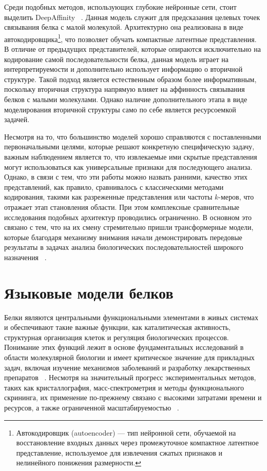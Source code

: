 \documentclass[specification,annotation,times]{itmo-student-thesis}
\begin{document}
Среди подобных методов, использующих глубокие нейронные сети, стоит выделить DeepAffinity ~\cite{karimi2019deepaffinity}. Данная модель служит для предсказания целевых точек связывания белка с малой молекулой. Архитектурно она реализована в виде автокодировщика\footnote{Автокодировщик (autoencoder) --- тип нейронной сети, обучаемой на восстановление входных данных через промежуточное компактное латентное представление, используемое для извлечения сжатых признаков и нелинейного понижения размерности.}, что позволяет обучать компактные латентные представления. В отличие от предыдущих представителей, которые опираются исключительно на кодирование самой последовательности белка, данная модель играет на интерпретируемости и дополнительно использует информацию о вторичной структуре. Такой подход является естественным образом более информативным, поскольку вторичная структура напрямую влияет на аффинность связывания белков с малыми молекулами. Однако наличие дополнительного этапа в виде моделирования вторичной структуры само по себе является ресурсоемкой задачей.

Несмотря на то, что большинство моделей хорошо справляются с поставленными первоначальными целями, которые решают конкретную специфическую задачу, важным наблюдением является то, что извлекаемые ими скрытые представления могут использоваться как универсальные признаки для последующего анализа. Однако, в связи с тем, что эти работы можно назвать ранними, качество этих представлений, как правило, сравнивалось с классическими методами кодирования, такими как разреженные представления или частоты $k$-меров, что отражает этап становления области. При этом комплексные сравнительные исследования подобных архитектур проводились ограниченно. В основном это связано с тем, что на их смену стремительно пришли трансформерные модели, которые благодаря механизму внимания начали демонстрировать передовые результаты в задачах анализа биологических последовательностей широкого назначения ~\cite{ofer2021language}.

\section{Языковые модели белков}\label{plm}

Белки являются центральными функциональными элементами в живых системах и обеспечивают такие важные функции, как каталитическая активность, структурная организация клеток и регуляция биологических процессов. Понимание этих функций лежит в основе фундаментальных исследований в области молекулярной биологии и имеет критическое значение для прикладных задач, включая изучение механизмов заболеваний и разработку лекарственных препаратов ~\cite{barabasi2011network}. Несмотря на значительный прогресс экспериментальных методов, таких как кристаллография, масс-спектрометрия и методы функционального скрининга, их применение по-прежнему связано с высокими затратами времени и ресурсов, а также ограниченной масштабируемостью ~\cite{pierre2015ultrahigh}.
\end{document}
